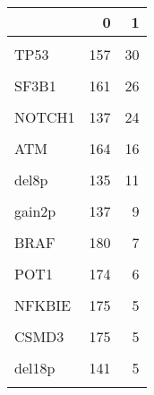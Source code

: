 \documentclass[11pt, a4paper, twosided]{book}
\begin{document}
\begin{table}
\centering
\begin{tabular}{l|r|r}
\hline
  & 0 & 1\\
\hline
\cellcolor[HTML]{E2E868}{del13q} & \cellcolor[HTML]{E2E868}{66} & \cellcolor[HTML]{E2E868}{108}\\
\hline
TP53 & 157 & 30\\
\hline
\cellcolor[HTML]{E2E868}{del11q} & \cellcolor[HTML]{E2E868}{148} & \cellcolor[HTML]{E2E868}{28}\\
\hline
SF3B1 & 161 & 26\\
\hline
\cellcolor[HTML]{E2E868}{trisomy12} & \cellcolor[HTML]{E2E868}{149} & \cellcolor[HTML]{E2E868}{25}\\
\hline
NOTCH1 & 137 & 24\\
\hline
\cellcolor[HTML]{E2E868}{del17p} & \cellcolor[HTML]{E2E868}{154} & \cellcolor[HTML]{E2E868}{20}\\
\hline
ATM & 164 & 16\\
\hline
\cellcolor[HTML]{E2E868}{gain8q} & \cellcolor[HTML]{E2E868}{159} & \cellcolor[HTML]{E2E868}{13}\\
\hline
del8p & 135 & 11\\
\hline
\cellcolor[HTML]{E2E868}{MED12} & \cellcolor[HTML]{E2E868}{170} & \cellcolor[HTML]{E2E868}{10}\\
\hline
gain2p & 137 & 9\\
\hline
\cellcolor[HTML]{E2E868}{KRAS} & \cellcolor[HTML]{E2E868}{177} & \cellcolor[HTML]{E2E868}{7}\\
\hline
BRAF & 180 & 7\\
\hline
\cellcolor[HTML]{E2E868}{del6q} & \cellcolor[HTML]{E2E868}{166} & \cellcolor[HTML]{E2E868}{7}\\
\hline
POT1 & 174 & 6\\
\hline
\cellcolor[HTML]{E2E868}{del9p} & \cellcolor[HTML]{E2E868}{140} & \cellcolor[HTML]{E2E868}{6}\\
\hline
NFKBIE & 175 & 5\\
\hline
\cellcolor[HTML]{E2E868}{FAT2} & \cellcolor[HTML]{E2E868}{175} & \cellcolor[HTML]{E2E868}{5}\\
\hline
CSMD3 & 175 & 5\\
\hline
\cellcolor[HTML]{E2E868}{del1q} & \cellcolor[HTML]{E2E868}{141} & \cellcolor[HTML]{E2E868}{5}\\
\hline
del18p & 141 & 5\\
\hline
\cellcolor[HTML]{E2E868}{del15q} & \cellcolor[HTML]{E2E868}{141} & \cellcolor[HTML]{E2E868}{5}\\

\end{tabular}
\end{table}
\end{document}
